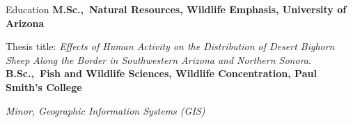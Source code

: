 \begin{rubric}{Education}
\entry*[2016 -- 2018]%
	\textbf{M.Sc.,~Natural Resources, Wildlife Emphasis, University of Arizona}\par
	Thesis title: \emph{Effects of Human Activity on the Distribution of Desert Bighorn Sheep Along the Border in Southwestern Arizona and Northern Sonora}\href{https://repository.arizona.edu/handle/10150/628159}{\scriptsize\faLink}.
\entry*[2009 -- 2013]%
	\textbf{B.Sc.,~Fish and Wildlife Sciences, Wildlife Concentration, Paul Smith's College} \par
 \emph{Minor, Geographic Information Systems (GIS)} \par
\end{rubric}